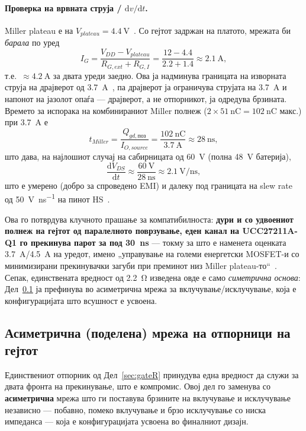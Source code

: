 \documentclass[journal,onecolumn,11pt]{IEEEtran}
\begin{document}
\paragraph{Проверка на врвната струја / $\mathrm{d}v/\mathrm{d}t$.} Miller plateau е
на $V_{plateau}=\SI{4.4}{\volt}$~\cite{ipt015ds}. Со гејтот задржан на платото,
мрежата би \emph{барала} по уред
\begin{equation}
I_{G}=\frac{V_{DD}-V_{plateau}}{R_{G,ext}+R_{G,I}}=\frac{12-4.4}{2.2+1.4}\approx\SI{2.1}{\ampere},
\end{equation}
т.е.\ $\approx\SI{4.2}{\ampere}$ за двата уреди заедно. Ова ја надминува границата на
изворната струја на драјверот од \SI{3.7}{\ampere}~\cite{ucc27211}, па драјверот ја
ограничува струјата на \SI{3.7}{\ampere} и напонот на јазолот опаѓа --- драјверот, а
не отпорникот, ја одредува брзината. Времето за испорака на комбинираниот Miller
полнеж ($2\times\SI{51}{\nano\coulomb}=\SI{102}{\nano\coulomb}$ макс.) при
\SI{3.7}{\ampere} е
\begin{equation}
t_{Miller}=\frac{Q_{gd,\text{поз}}}{I_{O,source}}=\frac{\SI{102}{\nano\coulomb}}{\SI{3.7}{\ampere}}\approx\SI{28}{\nano\second},
\end{equation}
што дава, на најлошиот случај на сабирницата од \SI{60}{\volt} (полна \SI{48}{\volt} батерија),
\begin{equation}
\frac{\mathrm{d}V_{DS}}{\mathrm{d}t}\approx\frac{\SI{60}{\volt}}{\SI{28}{\nano\second}}\approx\SI{2.1}{\volt\per\nano\second},
\end{equation}
што е умерено (добро за спроведено EMI) и далеку под границата на slew rate од
\SI{50}{\volt\per\nano\second} на пинот HS~\cite{ucc27211}.

Ова го потврдува клучното прашање за компатибилноста: \textbf{дури и со удвоениот
полнеж на гејтот од паралелното поврзување, еден канал на UCC27211A-Q1 го прекинува
парот за под \SI{30}{\nano\second}} --- токму за што е наменета оценката
\SI{3.7}{\ampere}/\SI{4.5}{\ampere} на уредот, имено „управување на големи енергетски
MOSFET-и со минимизирани прекинувачки загуби при преминот низ Miller
plateau-то“~\cite{ucc27211}. Сепак, единствената вредност од \SI{2.2}{\ohm} изведена
овде е само \emph{симетрична основа}: Дел~\ref{sec:asym} ја префинува во асиметрична
мрежа за вклучување/исклучување, која е конфигурацијата што всушност е усвоена.

\subsection{Асиметрична (поделена) мрежа на отпорници на гејтот}\label{sec:asym}
Единствениот отпорник од Дел~\ref{sec:gateR} принудува една вредност да служи за
двата фронта на прекинување, што е компромис. Овој дел го заменува со
\textbf{асиметрична} мрежа што ги поставува брзините на вклучување и исклучување
независно --- побавно, помеко вклучување и брзо исклучување со ниска импеданса ---
која е конфигурацијата усвоена во финалниот дизајн.
\end{document}
